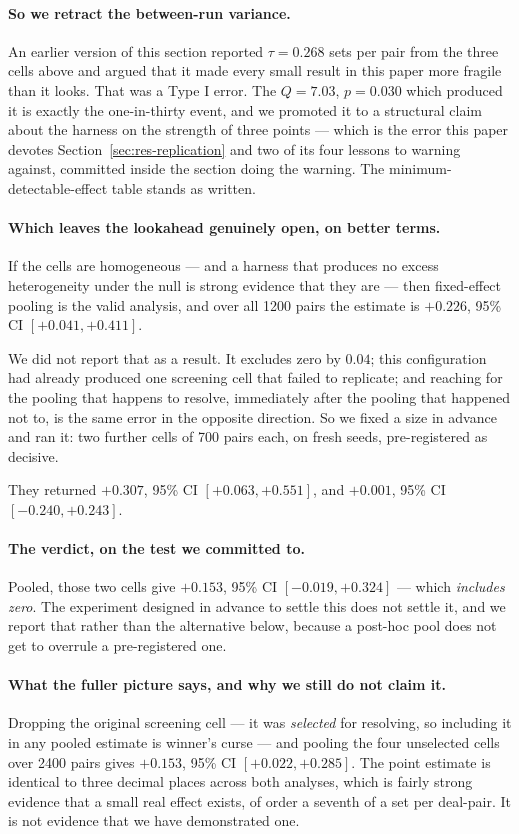 \documentclass[11pt,a4paper]{article}
\begin{document}
\paragraph{So we retract the between-run variance.} An earlier version of this
section reported $\tau = 0.268$ sets per pair from the three cells above and
argued that it made every small result in this paper more fragile than it looks.
That was a Type I error. The $Q = 7.03$, $p = 0.030$ which produced it is exactly
the one-in-thirty event, and we promoted it to a structural claim about the
harness on the strength of three points --- which is the error this paper devotes
Section~\ref{sec:res-replication} and two of its four lessons to warning against,
committed inside the section doing the warning. The minimum-detectable-effect
table stands as written.

\paragraph{Which leaves the lookahead genuinely open, on better terms.} If the
cells are homogeneous --- and a harness that produces no excess heterogeneity
under the null is strong evidence that they are --- then fixed-effect pooling is
the valid analysis, and over all 1200 pairs the estimate is $+0.226$, 95\% CI
$[+0.041, +0.411]$.

We did not report that as a result. It excludes zero by $0.04$; this
configuration had already produced one screening cell that failed to replicate;
and reaching for the pooling that happens to resolve, immediately after the
pooling that happened not to, is the same error in the opposite direction. So we
fixed a size in advance and ran it: two further cells of 700 pairs each, on fresh
seeds, pre-registered as decisive.

They returned $+0.307$, 95\% CI $[+0.063, +0.551]$, and $+0.001$, 95\% CI
$[-0.240, +0.243]$.

\paragraph{The verdict, on the test we committed to.} Pooled, those two cells
give $+0.153$, 95\% CI $[-0.019, +0.324]$ --- which \emph{includes zero}. The
experiment designed in advance to settle this does not settle it, and we report
that rather than the alternative below, because a post-hoc pool does not get to
overrule a pre-registered one.

\paragraph{What the fuller picture says, and why we still do not claim it.}
Dropping the original screening cell --- it was \emph{selected} for resolving, so
including it in any pooled estimate is winner's curse --- and pooling the four
unselected cells over 2400 pairs gives $+0.153$, 95\% CI $[+0.022, +0.285]$. The
point estimate is identical to three decimal places across both analyses, which
is fairly strong evidence that a small real effect exists, of order a seventh of
a set per deal-pair. It is not evidence that we have demonstrated one.
\end{document}
